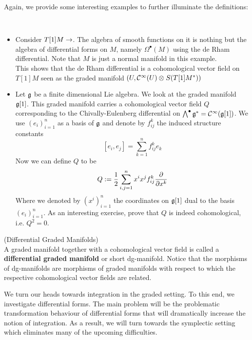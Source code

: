 Again, we provide some interesting examples to further illuminate the definitions:

\begin{example}~
\begin{itemize}
  \item Consider $T[1]M \rightarrow $. The algebra of smooth functions on it is nothing but the algebra of differential forms on $M$, namely $\Omega^\bullet(M)$ using the de Rham differential. Note that $M$ is just a normal manifold in this example.\\
  This shows that the de Rham differential is a cohomological vector field on $T[1]M$ seen as the graded manifold $(U, \mathcal{C}^{\infty}(U) \mathbin{\mathop{\otimes}\displaylimits_{}}S(T[1]M^*))$

  \item Let $\mathfrak{g}$ be a finite dimensional Lie algebra. We look at the graded manifold $\mathfrak{g} [1]$. This graded manifold carries a cohomological vector field $Q$ corresponding to the Chivally-Eulenberg differential on $\bigwedge^\bullet \mathfrak{g}^* = \mathcal{C}^{\infty}(\mathfrak{g}[1])$. We use $(e_i)^n_{i=1}$ as a basis of $\mathfrak{g}$ and denote by $f^k_{ij}$ the induced structure constants
  $$ [e_i, e_j] = \sum_{k=1}^n f_{ij}^k e_k $$
  Now we can define $Q$ to be
  $$ Q := \frac{1}{2} \sum_{i,j = 1}^n x^i x^j f_{ij}^k \frac{\partial }{\partial x^k} $$
  Where we denoted by $(x^i)_{i=1}^n$ the coordinates on $\mathfrak{g}[1]$ dual to the basis $(e_i)^n_{i=1}$. As an interesting exercise, prove that $Q$ is indeed cohomological, i.e. $Q^2=0$.
\end{itemize}
\end{example}


\begin{definition} (Differential Graded Manifolds)\\
  A graded manifold together with a cohomological vector field is called a \textbf{differential graded manifold} or short dg-manifold. Notice that the morphisms of dg-manifolds are morphisms of graded manifolds with respect to which the respective cohomological vector fields are related.
\end{definition}

We turn our heads towards integration in the graded setting. To this end, we investigate differential forms. The main problem will be the problematic transformation behaviour of differential forms that will dramatically increase the notion of integration. As a result, we will turn towards the symplectic setting which eliminates many of the upcoming difficulties.\\

